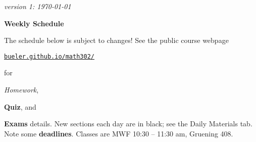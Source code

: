 \documentclass[12pt]{article}
\newcommand{\due}[1]{\strut {\color{BrickRed} \textsl{#1}}}
\newcommand{\ee}[1]{\strut {\color{Blue} \textbf{#1}}}
\newcommand{\dlinline}[1]{{\color{Purple} \textbf{#1}}}
\newcommand{\dl}[1]{{\small \dlinline{#1}}}
\begin{document}
\hfill \small \emph{version 1: \today} \normalsize

\bigskip\bigskip
\centerline{\Large \textbf{Weekly Schedule}}

\bigskip
The schedule below is subject to changes!  See the public course webpage

\medskip

\centerline{\href{https://bueler.github.io/math302/index.html}{\texttt{bueler.github.io/math302/}}}

\noindent for \due{Homework}, \ee{Quiz}, and \ee{Exams} details.  New sections each day are in black; see the Daily Materials tab.  Note some \dl{deadlines}.  Classes are MWF 10:30 -- 11:30 am, Gruening 408.


\bigskip
\end{document}
